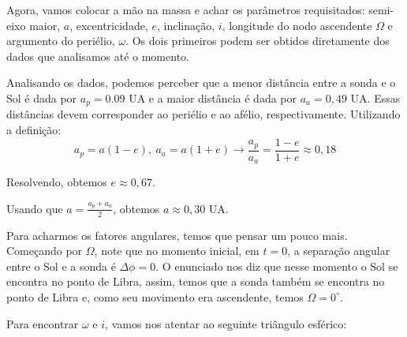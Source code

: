 \documentclass[11pt]{article}
\begin{document}
\begin{pproblem}
\begin{pssolution*}{}{}
\begin{alternativas}
            Agora, vamos colocar a mão na massa e achar os parâmetros requisitados: semi-eixo maior, \(a\), excentricidade, \(e\), inclinação, \(i\), longitude do nodo ascendente \(\Omega\) e argumento do periélio, \(\omega\). Os dois primeiros podem ser obtidos diretamente dos dados que analisamos até o momento.

            Analisando os dados, podemos perceber que a menor distância entre a sonda e o Sol é dada por \(a_p = 0.09\) UA e a maior distância é dada por \(a_a = 0,49\) UA. Essas distâncias devem corresponder ao periélio e ao afélio, respectivamente. Utilizando a definição:
            \[a_p = a(1-e), \ a_a=a(1+e) \rightarrow \frac{a_p}{a_a}=\frac{1-e}{1+e} \approx 0,18\]
            
            Resolvendo, obtemos \(e \approx 0,67\).

            Usando que \(a = \frac{a_p+a_a}{2}\), obtemos \(a\approx 0,30\) UA.

            Para acharmos os fatores angulares, temos que pensar um pouco mais. Começando por \(\Omega\), note que no momento inicial, em \(t=0\), a separação angular entre o Sol e a sonda é \(\Delta \phi = 0\). O enunciado nos diz que nesse momento o Sol se encontra no ponto de Libra, assim, temos que a sonda também se encontra no ponto de Libra e, como seu movimento era ascendente, temos \(\Omega = 0^\circ\).

            Para encontrar \(\omega\) e \(i\), vamos nos atentar ao seguinte triângulo esférico:


\end{alternativas}
\end{pssolution*}
\end{pproblem}
\end{document}

